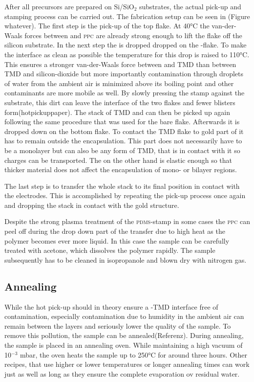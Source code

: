 After all precursors are prepared on Si/SiO$_2$ substrates, the actual pick-up and stamping process can be carried out. The fabrication setup can be seen in (Figure whatever). The first step is the pick-up of the top \hbn flake. At 40°C the van-der-Waals forces between \hbn and \textsc{ppc} are already strong enough to lift the flake off the silicon substrate. In the next step the \hbn is dropped dropped on the \tmd-flake. To make the interface as clean as possible the temperature for this drop is raised to 110°C. This ensures a stronger van-der-Waals force between \hbn and TMD than between TMD and silicon-dioxide but more importantly contamination through droplets of water from the ambient air is minimized above its boiling point and other contaminants are more mobile as well. By slowly pressing the stamp against the substrate, this dirt can leave the interface of the two flakes and fewer blisters form(hotpickuppaper). The stack of TMD and \hbn can then be picked up again following the same procedure that was used for the bare \hbn flake. Afterwards it is dropped down on the bottom \hbn flake. To contact the TMD flake to gold part of it has to remain outside the \hbn encapsulation. This part does not necessarily have to be a monolayer but can also be any form of TMD, that is in contact with it so charges can be transported. The \hbn on the other hand is elastic enough so that thicker material does not affect the encapsulation of mono- or bilayer regions.

The last step is to transfer the whole stack to its final position in contact with the electrodes. This is accomplished by repeating the pick-up process once again and dropping the stack in contact with the gold structure.

Despite the strong plasma treatment of the \textsc{pdms}-stamp in some cases the \textsc{ppc} can peel off during the drop down part of the transfer due to high heat as the polymer becomes ever more liquid. In this case the sample can be carefully treated with acetone, which dissolves the polymer rapidly. The sample subsequently has to be cleaned in isopropanole and blown dry with nitrogen gas. 

\subsection{Annealing}

While the hot pick-up should in theory ensure a \hbn-TMD interface free of contamination, especially contamination due to humidity in the ambient air can remain between the layers and seriously lower the quality of the sample. To remove this pollution, the sample can be annealed(Referenz). During annealing, the sample is placed in an annealing oven. While maintaining a high vacuum of 10$^{-3}$ mbar, the oven heats the sample up to 250°C for around three hours. Other recipes, that use higher or lower temperatures or longer annealing times can work just as well as long as they ensure the complete evaporation ov residual water. 

